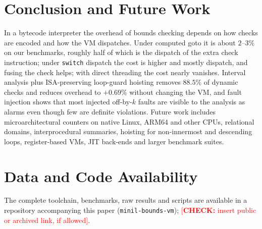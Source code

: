 \documentclass[11pt,a4paper]{article}
\newcommand{\todo}[1]{\textcolor{red}{[\textbf{CHECK:} #1]}}
\begin{document}
\section{Conclusion and Future Work}
In a bytecode interpreter the overhead of bounds checking depends on how checks are encoded and how the VM dispatches. Under computed goto it is about $2$--$3\%$ on our benchmarks, roughly half of which is the dispatch of the extra check instruction; under \texttt{switch} dispatch the cost is higher and mostly dispatch, and fusing the check helps; with direct threading the cost nearly vanishes. Interval analysis plus ISA-preserving loop-guard hoisting removes $88.5\%$ of dynamic checks and reduces overhead to $+0.69\%$ without changing the VM, and fault injection shows that most injected off-by-$k$ faults are visible to the analysis as alarms even though few are definite violations. Future work includes microarchitectural counters on native Linux, ARM64 and other CPUs, relational domains, interprocedural summaries, hoisting for non-innermost and descending loops, register-based VMs, JIT back-ends and larger benchmark suites.

\section*{Data and Code Availability}
The complete toolchain, benchmarks, raw results and scripts are available in a repository accompanying this paper (\texttt{minil-bounds-vm}); \todo{insert public or archived link, if allowed}.
\end{document}
